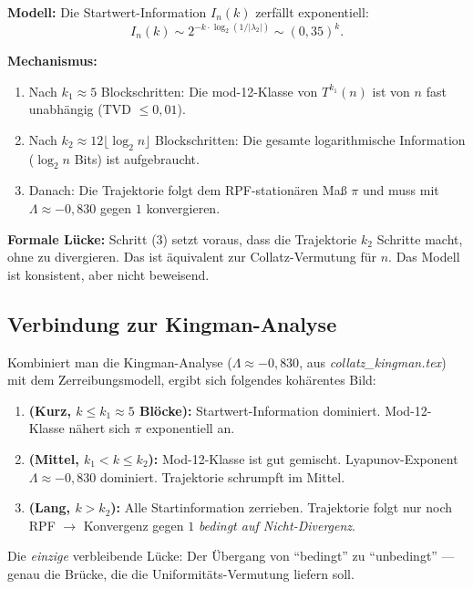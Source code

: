 \documentclass[12pt,a4paper]{article}
\begin{document}
\begin{tcolorbox}[dynfeld, title={Heuristisches Modell des Informations-Zerfalls}]
\textbf{Modell:} Die Startwert-Information $I_n(k)$ zerfällt exponentiell:
\[
  I_n(k) \sim 2^{-k \cdot \log_2(1/|\lambda_2|)} \sim (0{,}35)^k.
\]

\textbf{Mechanismus:}
\begin{enumerate}[label=(\arabic*), nosep]
  \item Nach $k_1 \approx 5$ Blockschritten: Die mod-12-Klasse von $T^{k_1}(n)$
    ist von $n$ fast unabhängig (TVD $\leq 0{,}01$).
  \item Nach $k_2 \approx 12 \lfloor\log_2 n\rfloor$ Blockschritten:
    Die gesamte logarithmische Information ($\log_2 n$ Bits) ist aufgebraucht.
  \item Danach: Die Trajektorie folgt dem RPF-stationären Maß $\pi$ und
    muss mit $\Lambda \approx -0{,}830$ gegen $1$ konvergieren.
\end{enumerate}

\medskip
\textbf{Formale Lücke:} Schritt (3) setzt voraus, dass die Trajektorie
$k_2$ Schritte macht, ohne zu divergieren. Das ist äquivalent zur Collatz-Vermutung
für $n$. Das Modell ist konsistent, aber nicht beweisend.
\end{tcolorbox}

\subsection{Verbindung zur Kingman-Analyse}

\begin{tcolorbox}[kernidee, title={Das vollständige Bild: Zerreibung + Lyapunov}]
Kombiniert man die Kingman-Analyse ($\Lambda \approx -0{,}830$, aus
\textit{collatz\_kingman.tex}) mit dem Zerreibungsmodell, ergibt sich
folgendes kohärentes Bild:

\medskip
\begin{enumerate}[label=\textbf{Phase \arabic*:}, leftmargin=*, align=left]
  \item \textbf{(Kurz, $k \leq k_1 \approx 5$ Blöcke):}
    Startwert-Information dominiert. Mod-12-Klasse nähert sich $\pi$
    exponentiell an.
  \item \textbf{(Mittel, $k_1 < k \leq k_2$):}
    Mod-12-Klasse ist gut gemischt. Lyapunov-Exponent $\Lambda \approx -0{,}830$
    dominiert. Trajektorie schrumpft im Mittel.
  \item \textbf{(Lang, $k > k_2$):}
    Alle Startinformation zerrieben. Trajektorie folgt nur noch RPF $\to$
    Konvergenz gegen $1$ \emph{bedingt auf Nicht-Divergenz}.
\end{enumerate}

\medskip
Die \emph{einzige} verbleibende Lücke: Der Übergang von ``bedingt'' zu
``unbedingt'' --- genau die Brücke, die die Uniformitäts-Vermutung
liefern soll.
\end{tcolorbox}
\end{document}
